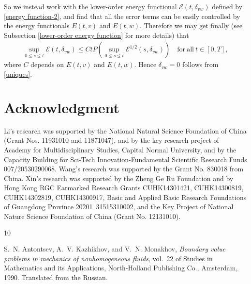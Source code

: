 \documentclass[11pt, reqno]{amsart}
\numberwithin{equation}{section}
\begin{document}
{So we instead work with the lower-order energy functional \(\mathcal{E}(t,\delta_{vw})\) defined by \eqref{energy function-2}, and find that all the error terms can be easily controlled by the energy functionals \(E(t,v)\) and \(E(t,w)\). Therefore we may  get finally (see Subsection \ref{lower-order energy function} for more details) that
\begin{equation}\label{uniques}
	\begin{aligned}
		\sup_{0\leq s\leq t}\mathcal{E}(t,\delta_{vw})
		\leq CtP(\sup_{0\leq s\leq t}\mathcal{E}^{1/2}(s,\delta_{vw}))\quad \mathrm{for\ all}\ t\in [0,T],
	\end{aligned}
\end{equation}
where \(C\) depends on \(E(t,v)\) and \(E(t,w)\). Hence \(\delta_{vw}=0\) follows from \eqref{uniques}.














\section*{Acknowledgment}
Li's research was supported by the National Natural Science Foundation of China (Grant Nos. 11931010 and 11871047), and by the key research project of Academy for Multidisciplinary Studies, Capital Normal University, and by the Capacity Building for Sci-Tech Innovation-Fundamental Scientific Research Funds 007/20530290068. Wang's research was supported by the Grant No. 830018 from China. 
Xin's research was supported by the Zheng Ge Ru Foundation and by Hong Kong RGC Earmarked Research Grants CUHK14301421, CUHK14300819, CUHK14302819, CUHK14300917,  Basic and Applied Basic Research Foundations of Guangdong Province 20201\
31515310002, and the Key Project of National Nature Science Foundation of China (Grant No. 12131010).



\begin{thebibliography}{10}
	
{\sc S.~N. Antontsev, A.~V. Kazhikhov, and V.~N. Monakhov}, {\em Boundary value problems in mechanics of nonhomogeneous fluids}, vol.~22 of Studies in Mathematics and its Applications, North-Holland Publishing Co., Amsterdam, 1990.
	\newblock Translated from the Russian.




\end{thebibliography}}
\end{document}

